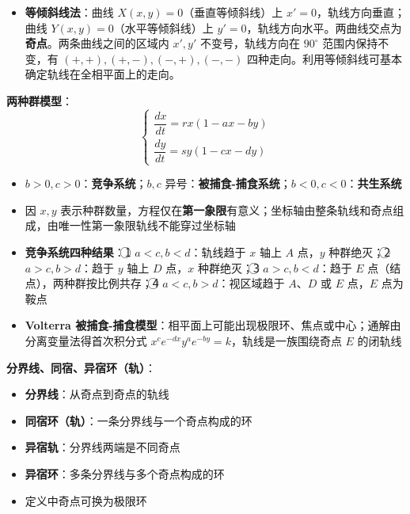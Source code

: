 \begin{itemize}
    \item \textbf{等倾斜线法}：曲线 $X(x,y) = 0$（垂直等倾斜线）上 $x' = 0$，轨线方向垂直；曲线 $Y(x,y) = 0$（水平等倾斜线）上 $y' = 0$，轨线方向水平。两曲线交点为\textbf{奇点}。两条曲线之间的区域内 $x', y'$ 不变号，轨线方向在 $90^\circ$ 范围内保持不变，有 $(+,+), (+,-), (-,+), (-,-)$ 四种走向。利用等倾斜线可基本确定轨线在全相平面上的走向。
\end{itemize}

\textbf{两种群模型}：
\begin{equation}\begin{cases} \dfrac{dx}{dt} = rx(1 - ax - by) \\ \dfrac{dy}{dt} = sy(1 - cx - dy) \end{cases} \tag{6.29}\end{equation}

\begin{itemize}
    \item $b > 0, c > 0$：\textbf{竞争系统}；$b, c$ 异号：\textbf{被捕食-捕食系统}；$b < 0, c < 0$：\textbf{共生系统}
    \item 因 $x, y$ 表示种群数量，方程仅在\textbf{第一象限}有意义；坐标轴由整条轨线和奇点组成，由唯一性第一象限轨线不能穿过坐标轴
    \item \textbf{竞争系统四种结果}：\textcircled{1} $a < c, b < d$：轨线趋于 $x$ 轴上 $A$ 点，$y$ 种群绝灭；\textcircled{2} $a > c, b > d$：趋于 $y$ 轴上 $D$ 点，$x$ 种群绝灭；\textcircled{3} $a > c, b < d$：趋于 $E$ 点（结点），两种群按比例共存；\textcircled{4} $a < c, b > d$：视区域趋于 $A$、$D$ 或 $E$ 点，$E$ 点为鞍点
    \item \textbf{Volterra 被捕食-捕食模型}：相平面上可能出现极限环、焦点或中心；通解由分离变量法得首次积分式 $x^c e^{-dx}y^a e^{-by} = k$，轨线是一族围绕奇点 $E$ 的闭轨线
\end{itemize}

\textbf{分界线、同宿、异宿环（轨）}：
\begin{itemize}
    \item \textbf{分界线}：从奇点到奇点的轨线
    \item \textbf{同宿环（轨）}：一条分界线与一个奇点构成的环
    \item \textbf{异宿轨}：分界线两端是不同奇点
    \item \textbf{异宿环}：多条分界线与多个奇点构成的环
    \item 定义中奇点可换为极限环
\end{itemize}

